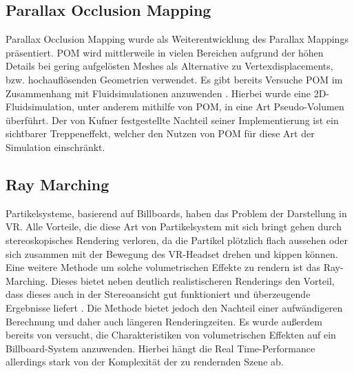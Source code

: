 \subsection{Parallax Occlusion Mapping}
Parallax Occlusion Mapping \parencite{Brawley2004} wurde als Weiterentwicklung des Parallax Mappings \parencite{Kaneko2001} präsentiert.
POM wird mittlerweile in vielen Bereichen aufgrund der höhen Details bei gering aufgelösten Meshes \parencite{Tatarchuk2006} als 
Alternative zu Vertexdisplacements, bzw. hochauflösenden Geometrien verwendet. Es gibt bereits Versuche POM im Zusammenhang mit Fluidsimulationen 
anzuwenden \parencite{Kufner2017}. Hierbei wurde eine 2D-Fluidsimulation, unter anderem mithilfe von POM, in eine Art Pseudo-Volumen überführt. 
Der von Kufner festgestellte Nachteil seiner Implementierung ist ein sichtbarer Treppeneffekt, welcher den Nutzen von POM für diese 
Art der Simulation einschränkt. 



\subsection{Ray Marching}
Partikelsysteme, basierend auf Billboards, haben das Problem der Darstellung in VR. Alle Vorteile, die diese Art von 
Partikelsystem mit sich bringt gehen durch stereoskopisches Rendering verloren, da die Partikel plötzlich flach aussehen 
oder sich zusammen mit der Bewegung des VR-Headset drehen und kippen können. Eine weitere Methode um solche volumetrischen 
Effekte zu rendern ist das Ray-Marching. Dieses bietet neben deutlich realistischeren Renderings den Vorteil, dass dieses 
auch in der Stereoansicht gut funktioniert und überzeugende Ergebnisse liefert \parencite{Wald2006}. Die Methode bietet 
jedoch den Nachteil einer aufwändigeren Berechnung und daher auch längeren Renderingzeiten. Es wurde außerdem bereits von 
\textcite{Zhang2020} versucht, die Charakteristiken von volumetrischen Effekten auf ein Billboard-System anzuwenden. 
Hierbei hängt die Real Time-Performance allerdings stark von der Komplexität der zu rendernden Szene ab.
